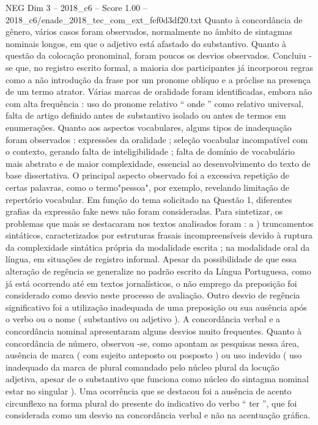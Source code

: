 \begin{textsample}{NEG Dim 3 – 2018\_c6 – Score 1.00 – 2018\_c6/enade\_2018\_tec\_com\_ext\_fef0d3df20.txt}
Quanto à concordância de gênero, vários casos foram observados, normalmente no âmbito de sintagmas nominais longos, em que o adjetivo está afastado do substantivo.
Quanto à questão da colocação pronominal, foram poucos os desvios observados.
Concluiu -se que, no registro escrito formal, a maioria dos participantes já incorporou regras como a não introdução da frase por um pronome oblíquo e a próclise na presença de um termo atrator.
Várias marcas de oralidade foram identificadas, embora não com alta frequência : uso do pronome relativo “ onde ” como relativo universal, falta de artigo definido antes de substantivo isolado ou antes de termos em enumerações.
Quanto aos aspectos vocabulares, alguns tipos de inadequação foram observados : expressões da oralidade ; seleção vocabular incompatível com o contexto, gerando falta de inteligibilidade ; falta de domínio de vocabulário mais abstrato e de maior complexidade, essencial ao desenvolvimento do texto de base dissertativa.
O principal aspecto observado foi a excessiva repetição de certas palavras, como o termo"pessoa", por exemplo, revelando limitação de repertório vocabular.
Em função do tema solicitado na Questão 1, diferentes grafias da expressão fake news não foram consideradas.
Para sintetizar, os problemas que mais se destacaram nos textos analisados foram : a ) truncamentos sintáticos, caracterizados por estruturas frasais incompreensíveis devido à ruptura da complexidade sintática própria da modalidade escrita ; na modalidade oral da língua, em situações de registro informal.
Apesar da possibilidade de que essa alteração de regência se generalize no padrão escrito da Língua Portuguesa, como já está ocorrendo até em textos jornalísticos, o não emprego da preposição foi considerado como desvio neste processo de avaliação.
Outro desvio de regência significativo foi a utilização inadequada de uma preposição ou sua ausência após o verbo ou o nome ( substantivo ou adjetivo ).
A concordância verbal e a concordância nominal apresentaram alguns desvios muito frequentes.
Quanto à concordância de número, observou -se, como apontam as pesquisas nessa área, ausência de marca ( com sujeito anteposto ou posposto ) ou uso indevido ( uso inadequado da marca de plural comandado pelo núcleo plural da locução adjetiva, apesar de o substantivo que funciona como núcleo do sintagma nominal estar no singular ).
Uma ocorrência que se destacou foi a ausência de acento circunflexo na forma plural do presente do indicativo do verbo “ ter ”, que foi considerada como um desvio na concordância verbal e não na acentuação gráfica.

\end{textsample}
